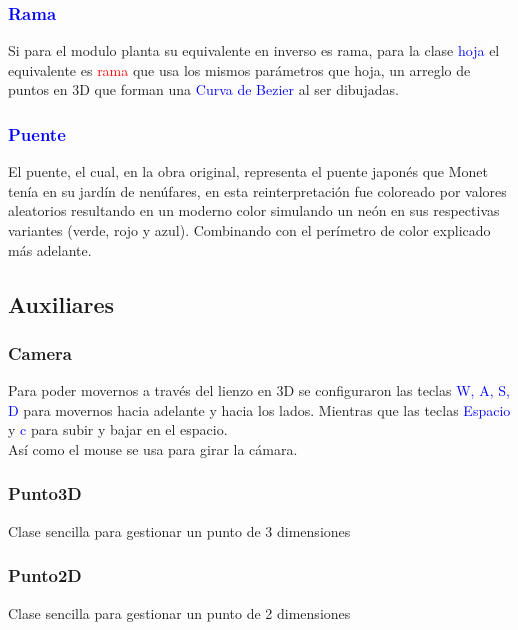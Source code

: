 \documentclass[11pt,a4paper]{article}
\begin{document}
		\subsubsection{\textcolor{blue}{Rama}}

			Si para el modulo planta su equivalente en inverso es rama, para la clase \textcolor{blue}{hoja} el equivalente es \textcolor{red}{rama} que usa los mismos parámetros que hoja, un arreglo de puntos en 3D que forman una \textcolor{blue}{Curva de Bezier} al ser dibujadas.

		\subsubsection{\textcolor{blue}{Puente}}

			El puente, el cual, en la obra original, representa el puente japonés que Monet tenía en su jardín de nenúfares, en esta reinterpretación fue coloreado por valores aleatorios resultando en un moderno color simulando un neón en sus respectivas variantes (verde, rojo y azul). Combinando con el perímetro de color explicado más adelante.

	\subsection{Auxiliares}

		\subsubsection{Camera}

			Para poder movernos a través del lienzo en 3D se configuraron las teclas \textcolor{blue}{W, A, S, D} para movernos hacia adelante y hacia los lados. Mientras que las teclas \textcolor{blue}{Espacio} y \textcolor{blue}{c} para subir y bajar en el espacio.\\
			Así como el mouse se usa para girar la cámara.

		 \subsubsection{Punto3D}

		 	Clase sencilla para gestionar un punto de 3 dimensiones

		 \subsubsection{Punto2D}

		 	Clase sencilla para gestionar un punto de 2 dimensiones
\end{document}

